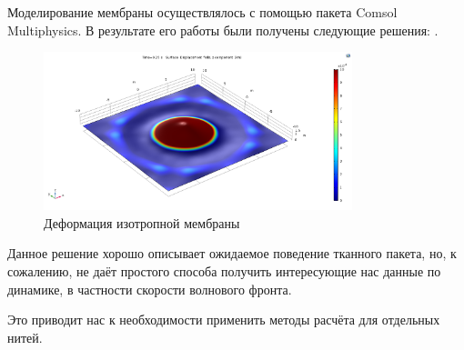 Моделирование мембраны осуществлялось с помощью пакета Comsol Multiphysics.
В результате его работы были получены следующие решения: .

\begin{figure}[H]
    \centering
    \label{pic:comsol-example-1}
    \includegraphics[width=0.8\textwidth]{img/comsol/example_1.png}
    \caption{Деформация изотропной мембраны}
\end{figure}

Данное решение хорошо описывает ожидаемое поведение тканного пакета, но, к сожалению, не даёт простого способа
получить интересующие нас данные по динамике, в частности скорости волнового фронта.

Это приводит нас к необходимости применить методы расчёта для отдельных нитей.

